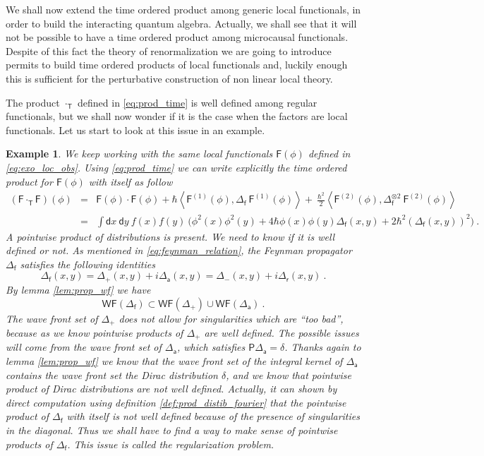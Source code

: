 \documentclass[11pt]{book}
\newcommand{\WF}{\mathsf{WF}}
\newcommand{\sm}[1]{\left\langle#1\right\rangle}
\newcommand{\Fsf}{\mathsf{F}}
\newcommand{\Psf}{\mathsf{P}}
\newcommand{\Tsf}{\mathsf{T}}
\newcommand{\asf}{\mathsf{a}}
\newcommand{\dsf}{\mathsf{d}}
\newcommand{\fsf}{\mathsf{f}}
\newcommand{\rsf}{\mathsf{r}}
\theoremstyle{break}
\newtheorem{example}{Example}[chapter]
\begin{document}
We shall now extend the time ordered product among generic local functionals, in order to build the interacting quantum algebra. Actually, we shall see that it will not be possible to have a time ordered product among microcausal functionals. Despite of this fact the theory of renormalization we are going to introduce permits to build time ordered products of local functionals and, luckily enough this is sufficient for the perturbative construction of non linear local theory.


The product $\cdot_\Tsf$ defined in \eqref{eq:prod_time} is well defined among regular functionals, but we shall now wonder if it is the case when the factors are local functionals. Let us start to look at this issue in an example.


\begin{example}\label{exo:t_prod_loc_obs}
We keep working with the same local functionals $\Fsf(\phi)$ defined in \eqref{eq:exo_loc_obs}. Using \eqref{eq:prod_time} we can write explicitly the time ordered product for $\Fsf(\phi)$ with itself as follow
%
\begin{eqnarray*}
(\Fsf \cdot_\Tsf \Fsf)(\phi) &=& \Fsf(\phi) \cdot \Fsf(\phi) + \hbar \sm{ \Fsf^{(1)}(\phi) , \Delta_\fsf \ \Fsf^{(1)}(\phi) } + \ \frac{\hbar^2}{2} \sm{ \Fsf^{(2)}(\phi) , \Delta_\fsf^{\otimes 2} \ \Fsf^{(2)}(\phi)} \\
%
&=& \int \dsf x \ \dsf y \ f(x) f(y) \ \bigg( \phi^2(x) \phi^2(y) + 4 \hbar \phi(x) \phi(y) \Delta_\fsf(x,y) + 2 \hbar^2 \left(\Delta_\fsf(x,y)\right)^2 \bigg) \ .
\end{eqnarray*}
%
A pointwise product of distributions is present. We need to know if it is well defined or not. As mentioned in \eqref{eq:feynman_relation}, the Feynman propagator $\Delta_\fsf$ satisfies the following identities
%
\begin{equation}
\Delta_\fsf(x,y) = \Delta_+(x,y) + i \Delta_\asf(x,y) = \Delta_-(x,y) + i \Delta_\rsf(x,y) \ .
\label{eq:conv_feynman_prop}
\end{equation}
%
By lemma \ref{lem:prop_wf} we have
%
\begin{equation*}
\WF(\Delta_\fsf) \subset \WF(\Delta_+) \cup \WF(\Delta_\asf) \ .
\end{equation*}
%
The wave front set of $\Delta_+$ does not allow for  singularities which are ``too bad'', because as we know pointwise products of $\Delta_+$ are well defined. The possible issues will come from the wave front set of $\Delta_\asf$, which satisfies $\Psf \Delta_\asf = \delta$. Thanks again to lemma \ref{lem:prop_wf} we know that the wave front set of the integral kernel of $\Delta_\asf$ contains the wave front set the Dirac distribution $\delta$, and we know that pointwise product of Dirac distributions are not well defined. 
Actually, it can shown by direct computation using definition \ref{def:prod_distib_fourier} that the pointwise product of $\Delta_\fsf$ with itself is not well defined because of the presence of singularities in the diagonal. Thus we shall have to find a way to make sense of pointwise products of $\Delta_\fsf$. This issue is called the regularization problem.
\end{example}
\end{document}
